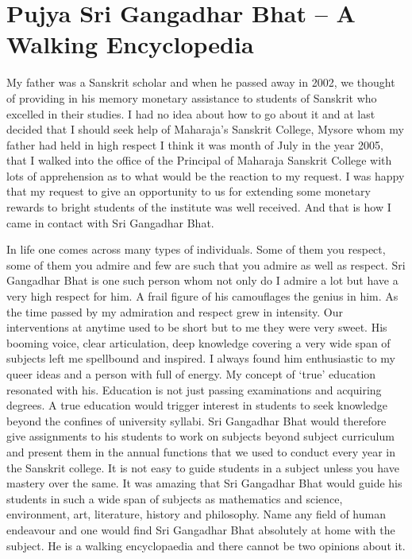 \chapter{Pujya Sri Gangadhar Bhat – A Walking Encyclopedia}

\begin{center}
\addrule
\end{center}

My father was a Sanskrit scholar and when he passed away in 2002, we thought of providing in his memory monetary assistance to students of Sanskrit who excelled in their studies. I had no idea about how to go about it and at last decided that I should seek help of Maharaja’s Sanskrit College, Mysore whom my father had held in high respect I think it was month of July in the year 2005, that I walked into the office of the Principal of Maharaja Sanskrit College with lots of apprehension as to what would be the reaction to my request. I was happy that my request to give an opportunity to us for extending some monetary rewards to bright students of the institute was well received. And that is how I came in contact with Sri Gangadhar Bhat.

In life one comes across many types of individuals. Some of them you respect, some of them you admire and few are such that you admire as well as respect. Sri Gangadhar Bhat is one such person whom not only do I admire a lot but have a very high respect for him. A frail figure of his camouflages the genius in him. As the time passed by my admiration and respect grew in intensity. Our interventions at anytime used to be short but to me they were very sweet. His booming voice, clear articulation, deep knowledge covering a very wide span of subjects left me spellbound and inspired. I always found him enthusiastic to my queer ideas and a person with full of energy. My concept of ‘true’ education resonated with his. Education is not just passing examinations and acquiring degrees. A true education would trigger interest in students to seek knowledge beyond the confines of university syllabi. Sri Gangadhar Bhat would therefore give assignments to his students to work on subjects beyond subject curriculum and present them in the annual functions that we used to conduct every year in the Sanskrit college. It is not easy to guide students in a subject unless you have mastery over the same. It was amazing that Sri Gangadhar Bhat would guide his students in such a wide span of subjects as mathematics and science, environment, art, literature, history and philosophy. Name any field of human endeavour and one would find Sri Gangadhar Bhat absolutely at home with the subject. He is a walking encyclopaedia and there cannot be two opinions about it. 	

